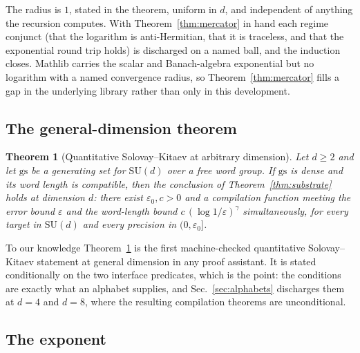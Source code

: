 \documentclass[aps,pra,reprint,nofootinbib,superscriptaddress]{revtex4-2}
\newcommand{\su}[1]{\mathrm{SU}(#1)}
\theoremstyle{plain}
\newtheorem{theorem}{Theorem}
\theoremstyle{definition}
\begin{document}
The radius is $1$, stated in the theorem, uniform in $d$, and independent of
anything the recursion computes. With Theorem~\ref{thm:mercator} in hand each
regime conjunct (that the logarithm is anti-Hermitian, that it is traceless,
and that the exponential round trip holds) is discharged on a named ball, and
the induction closes. Mathlib carries the scalar and Banach-algebra exponential
but no logarithm with a named convergence radius, so
Theorem~\ref{thm:mercator} fills a gap in the underlying library rather than
only in this development.

\subsection{The general-dimension theorem}

\begin{theorem}[Quantitative Solovay--Kitaev at arbitrary dimension]
\label{thm:sud}
Let $d \ge 2$ and let $\mathrm{gs}$ be a generating set for $\su d$ over a free
word group. If $\mathrm{gs}$ is dense and its word length is compatible, then
the conclusion of Theorem~\ref{thm:substrate} holds at dimension $d$: there
exist $\varepsilon_0, c > 0$ and a compilation function meeting the error bound
$\varepsilon$ and the word-length bound
$c\,(\log 1/\varepsilon)^{\gamma}$ simultaneously, for every target in $\su d$
and every precision in $(0,\varepsilon_0]$.
\end{theorem}

To our knowledge Theorem~\ref{thm:sud} is the first machine-checked
quantitative Solovay--Kitaev statement at general dimension in any proof
assistant. It is stated conditionally on the two interface predicates, which is
the point: the conditions are exactly what an alphabet supplies, and
Sec.~\ref{sec:alphabets} discharges them at $d = 4$ and $d = 8$, where the
resulting compilation theorems are unconditional.

\subsection{The exponent}
\label{sec:sud-exponent}
\end{document}
